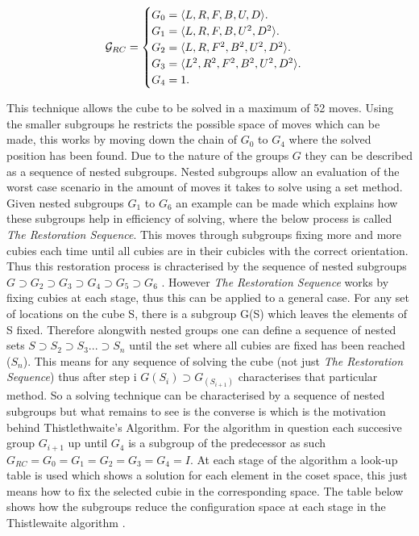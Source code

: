 \documentclass{article}
\DeclarePairedDelimiter{\opair}{\langle}{\rangle}
\newcounter{lem}[section]\setcounter{lem}{0}
\begin{document}
\begin{equation}
  \mathcal{G}_{RC}=\begin{cases}
    G_{0} = \text{$\opair{L,R,F,B,U,D}$}.\\
    G_{1} = \text{$\opair{L,R,F,B,U^{2},D^{2}}$}.\\
    G_{2} = \text{$\opair{L,R,F^{2},B^{2},U^{2},D^{2}}$}.\\
    G_{3} = \text{$\opair{L^{2},R^{2},F^{2},B^{2},U^{2},D^{2}}$}.\\
    G_{4} = \text{1}.
  \end{cases}
\end{equation}

This technique allows the cube to be solved in a maximum of 52 moves. Using the smaller subgroups he restricts the possible space of moves which can be made, this works by moving down the chain of $G_{0}$ to $G_{4}$ where the solved position has been found. Due to the nature of the groups $G$ they can be described as a sequence of nested subgroups. Nested subgroups allow an evaluation of the worst case scenario in the amount of moves it takes to solve using a set method. Given nested subgroups $G_1$ to $G_6$ an example can be made which explains how these subgroups help in efficiency of solving, where the below process is called \textit{The Restoration Sequence}. This moves through subgroups fixing more and more cubies each time until all cubies are in their cubicles with the correct orientation. Thus this restoration process is chracterised by the sequence of nested subgroups $G \supset G_2 \supset G_3 \supset G_4 \supset G_5 \supset G_6 $ \cite{alexander1982handbook}.
However \textit{The Restoration Sequence} works by fixing cubies at each stage, thus this can be applied to a general case. For any set of locations on the cube S, there is a subgroup G(S) which leaves the elements of S fixed. Therefore alongwith nested groups one can define a sequence of nested sets $S \supset S_2 \supset S_3 ... \supset S_n $ until the set where all cubies are fixed has been reached ($S_n$). This means for any sequence of solving the cube (not just \textit{The Restoration Sequence}) thus after step i $G(S_i) \supset G_(S_{i+1})$ characterises that particular method. So a solving technique can be characterised by a sequence of nested subgroups but what remains to see is the converse is which is the motivation behind Thistlethwaite's Algorithm. For the algorithm in question each succesive group $G_{i+1}$ up until $G_4$ is a subgroup of the predecessor as such $G_{RC} = G_0 = G_1 = G_2 = G_3 = G_4= I$. At each stage of the algorithm a look-up table is used which shows a solution for each element in the coset space, this just means how to fix the selected cubie in the corresponding space. The table below shows how the subgroups reduce the configuration space at each stage in the Thistlewaite algorithm \cite{Thistlethwaite}.
\end{document}
